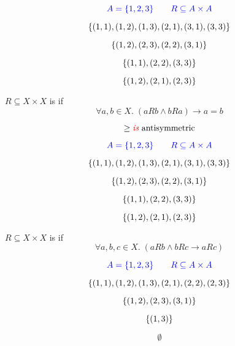 \begin{frame}{}
  \[
    \textcolor{blue}{A = \{1, 2, 3\} \qquad R \subseteq A \times A}
  \]

  \pause
  \[
    \{(1, 1), (1, 2), (1, 3), (2, 1), (3, 1), (3, 3)\}
  \]

  \pause
  \[
    \{(1, 2), (2, 3), (2, 2), (3, 1)\}
  \]

  \pause
  \[
    \{(1, 1), (2, 2), (3, 3)\}
  \]

  \pause
  \[
    \{(1, 2), (2, 1), (2, 3)\}
  \]
\end{frame}

\begin{frame}{}
  \begin{definition}
    $R \subseteq X \times X$ is  if
    \[
      \forall a, b \in X.\; (a R b \land b R a) \to a = b
    \]
  \end{definition}

  \pause
  \[
    \ge \text{\textcolor{red}{\it is} antisymmetric}
  \]
\end{frame}

\begin{frame}{}
  \[
    \textcolor{blue}{A = \{1, 2, 3\} \qquad R \subseteq A \times A}
  \]

  \pause
  \[
    \{(1, 1), (1, 2), (1, 3), (2, 1), (3, 1), (3, 3)\}
  \]

  \pause
  \[
    \{(1, 2), (2, 3), (2, 2), (3, 1)\}
  \]

  \pause
  \[
    \{(1, 1), (2, 2), (3, 3)\}
  \]

  \pause
  \[
    \{(1, 2), (2, 1), (2, 3)\}
  \]
\end{frame}

\begin{frame}{}
  \begin{definition}
    $R \subseteq X \times X$ is  if
    \[
      \forall a, b, c \in X.\; (a R b \land b R c \to a R c)
    \]

  \end{definition}
\end{frame}

\begin{frame}{}
  \[
    \textcolor{blue}{A = \{1, 2, 3\} \qquad R \subseteq A \times A}
  \]

  \pause
  \[
    \{(1, 1), (1, 2), (1, 3), (2, 1), (2, 2), (2, 3)\}
  \]

  \pause
  \[
    \{(1, 2), (2, 3), (3, 1)\}
  \]

  \pause
  \[
    \{(1, 3)\}
  \]

  \pause
  \[
    \emptyset
  \]
\end{frame}


